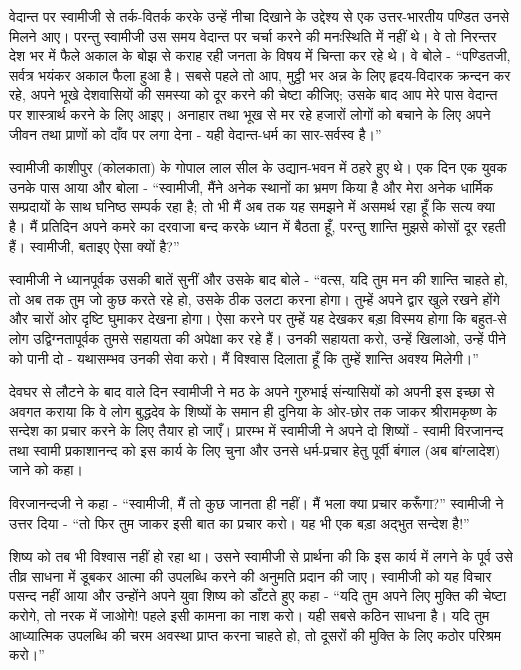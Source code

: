 \delimiter

वेदान्त पर स्वामीजी से तर्क-वितर्क करके उन्हें नीचा दिखाने के उद्देश्य से एक उत्तर-भारतीय पण्डित उनसे मिलने आए। परन्तु स्वामीजी उस समय वेदान्त पर चर्चा करने की मनःस्थिति में नहीं थे। वे तो निरन्तर देश भर में फैले अकाल के बोझ से कराह रही जनता के विषय में चिन्ता कर रहे थे। वे बोले - “पण्डितजी, सर्वत्र भयंकर अकाल फैला हुआ है। सबसे पहले तो आप, मुट्ठी भर अन्न के लिए हृदय-विदारक क्रन्दन कर रहे, अपने भूखे देशवासियों की समस्या को दूर करने की चेष्टा कीजिए; उसके बाद आप मेरे पास वेदान्त पर शास्त्रार्थ करने के लिए आइए। अनाहार तथा भूख से मर रहे हजारों लोगों को बचाने के लिए अपने जीवन तथा प्राणों को दाँव पर लगा देना - यही वेदान्त-धर्म का सार-सर्वस्व है।” 

\delimiter

स्वामीजी काशीपुर (कोलकाता) के गोपाल लाल सील के उद्यान-भवन में ठहरे हुए थे। एक दिन एक युवक उनके पास आया और बोला - “स्वामीजी, मैंने अनेक स्थानों का भ्रमण किया है और मेरा अनेक धार्मिक सम्प्रदायों के साथ घनिष्ठ सम्पर्क रहा है; तो भी मैं अब तक यह समझने में असमर्थ रहा हूँ कि सत्य क्या है। मैं प्रतिदिन अपने कमरे का दरवाजा बन्द करके ध्यान में बैठता हूँ, परन्तु शान्ति मुझसे कोसों दूर रहती हैं। स्वामीजी, बताइए ऐसा क्यों है?” 

स्वामीजी ने ध्यानपूर्वक उसकी बातें सुनीं और उसके बाद बोले - “वत्स, यदि तुम मन की शान्ति चाहते हो, तो अब तक तुम जो कुछ करते रहे हो, उसके ठीक उलटा करना होगा। तुम्हें अपने द्वार खुले रखने होंगे और चारों ओर दृष्टि घुमाकर देखना होगा। ऐसा करने पर तुम्हें यह देखकर बड़ा विस्मय होगा कि बहुत-से लोग उद्विग्नतापूर्वक तुमसे सहायता की अपेक्षा कर रहे हैं। उनकी सहायता करो, उन्हें खिलाओ, उन्हें पीने को पानी दो - यथासम्भव उनकी सेवा करो। मैं विश्वास दिलाता हूँ कि तुम्हें शान्ति अवश्य मिलेगी।” 

\delimiter

देवघर से लौटने के बाद वाले दिन स्वामीजी ने मठ के अपने गुरुभाई संन्यासियों को अपनी इस इच्छा से अवगत कराया कि वे लोग बुद्धदेव के शिष्यों के समान ही दुनिया के ओर-छोर तक जाकर श्रीरामकृष्ण के सन्देश का प्रचार करने के लिए तैयार हो जाएँ। प्रारम्भ में स्वामीजी ने अपने दो शिष्यों - स्वामी विरजानन्द तथा स्वामी प्रकाशानन्द को इस कार्य के लिए चुना और उनसे धर्म-प्रचार हेतु पूर्वी बंगाल (अब बांग्लादेश) जाने को कहा। 

विरजानन्दजी ने कहा - “स्वामीजी, मैं तो कुछ जानता ही नहीं। मैं भला क्या प्रचार करूँगा?” स्वामीजी ने उत्तर दिया - “तो फिर तुम जाकर इसी बात का प्रचार करो। यह भी एक बड़ा अद्भुत सन्देश है!” 

शिष्य को तब भी विश्वास नहीं हो रहा था। उसने स्वामीजी से प्रार्थना की कि इस कार्य में लगने के पूर्व उसे तीव्र साधना में डूबकर आत्मा की उपलब्धि करने की अनुमति प्रदान की जाए। स्वामीजी को यह विचार पसन्द नहीं आया और उन्होंने अपने युवा शिष्य को डाँटते हुए कहा - “यदि तुम अपने लिए मुक्ति की चेष्टा करोगे, तो नरक में जाओगे! पहले इसी कामना का नाश करो। यही सबसे कठिन साधना है। यदि तुम आध्यात्मिक उपलब्धि की चरम अवस्था प्राप्त करना चाहते हो, तो दूसरों की मुक्ति के लिए कठोर परिश्रम करो।” 


